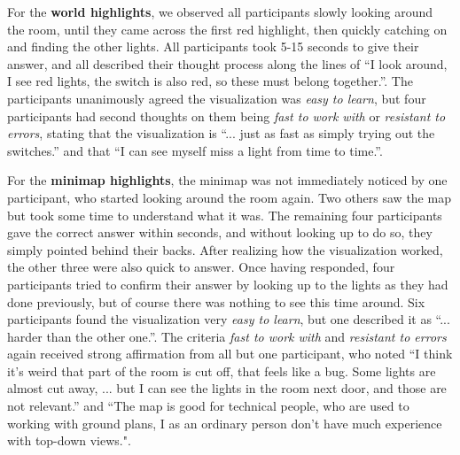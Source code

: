 For the \textbf{world highlights}, we observed all participants slowly looking around the room, until they came across the first red highlight, then quickly catching on and finding the other lights. All participants took 5-15 seconds to give their answer, and all described their thought process along the lines of ``I look around, I see red lights, the switch is also red, so these must belong together.''. The participants unanimously agreed the visualization was \textit{easy to learn}, but four participants had second thoughts on them being \textit{fast to work with} or \textit{resistant to errors}, stating that the visualization is ``... just as fast as simply trying out the switches.'' and that ``I can see myself miss a light from time to time.''.

For the \textbf{minimap highlights}, the minimap was not immediately noticed by one participant, who started looking around the room again. Two others saw the map but took some time to understand what it was. The remaining four participants gave the correct answer within seconds, and without looking up to do so, they simply pointed behind their backs. After realizing how the visualization worked, the other three were also quick to answer. Once having responded, four participants tried to confirm their answer by looking up to the lights as they had done previously, but of course there was nothing to see this time around. Six participants found the visualization very \textit{easy to learn}, but one described it as ``... harder than the other one.''. The criteria \textit{fast to work with} and \textit{resistant to errors} again received strong affirmation from all but one participant, who noted ``I think it's weird that part of the room is cut off, that feels like a bug. Some lights are almost cut away, ... but I can see the lights in the room next door, and those are not relevant.'' and ``The map is good for technical people, who are used to working with ground plans, I as an ordinary person don't have much experience with top-down views.".

